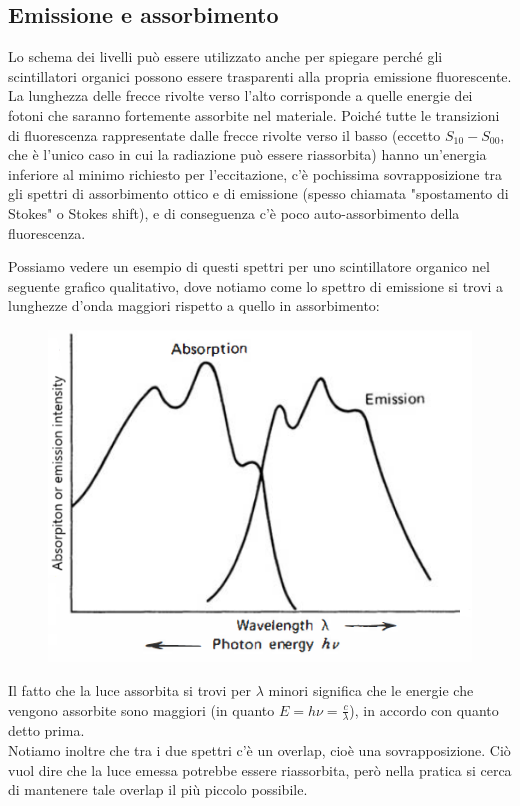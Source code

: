 \subsection{Emissione e assorbimento}

Lo schema dei livelli può essere utilizzato anche per spiegare perché gli scintillatori organici possono essere trasparenti alla propria emissione fluorescente. La lunghezza delle frecce rivolte verso l'alto corrisponde a quelle energie dei fotoni che saranno fortemente assorbite nel materiale. Poiché tutte le transizioni di fluorescenza rappresentate dalle frecce rivolte verso il basso (eccetto $S_{10}-S_{00}$, che è l'unico caso in cui la radiazione può essere riassorbita) hanno un'energia inferiore al minimo richiesto per l'eccitazione, c'è pochissima sovrapposizione tra gli spettri di assorbimento ottico e di emissione (spesso chiamata "spostamento di Stokes" o Stokes shift), e di conseguenza c'è poco auto-assorbimento della fluorescenza.

Possiamo vedere un esempio di questi spettri per uno scintillatore organico nel seguente grafico qualitativo, dove notiamo come lo spettro di emissione si trovi a lunghezze d'onda maggiori rispetto a quello in assorbimento:

\begin{minipage}{0.465\textwidth}
   \begin{figure}[H]
      \centering
      \includegraphics[width=\textwidth]{immagini/spettro_assorbimento_e_emissione_scintillatori_organici.png}
   \end{figure}
\end{minipage}
\begin{minipage}{0.53\textwidth}
   \vspace{0.3cm}Il fatto che la luce assorbita si trovi per $\lambda$ minori significa che le energie che vengono assorbite sono maggiori (in quanto $E=h\nu=\frac{c}{\lambda}$), in accordo con quanto detto prima.\\Notiamo inoltre che tra i due spettri c'è un overlap, cioè una sovrapposizione. Ciò vuol dire che la luce emessa potrebbe essere riassorbita, però nella pratica si cerca di mantenere tale overlap il più piccolo possibile.
\end{minipage}


